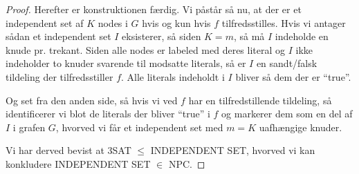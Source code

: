 \begin{proof}
Herefter er konstruktionen færdig. Vi påstår så nu, at der er et independent set af $K$ nodes i $G$ hvis og kun hvis $f$ tilfredsstilles. Hvis vi antager sådan et independent set $I$ eksisterer, så siden $K=m$, så må $I$ indeholde en knude pr. trekant. Siden alle nodes er labeled med deres literal og $I$ ikke indeholder to knuder svarende til modsatte literals, så er $I$ en sandt/falsk tildeling der tilfredsstiller $f$. Alle literals indeholdt i $I$ bliver så dem der er ``true''.

Og set fra den anden side, så hvis vi ved $f$ har en tilfredstillende tildeling, så identificerer vi blot de literals der bliver ``true'' i $f$ og markerer dem som en del af $I$ i grafen $G$, hvorved vi får et independent set med $m=K$ uafhængige knuder.

Vi har derved bevist at 3SAT $\leq$ INDEPENDENT SET, hvorved vi kan konkludere INDEPENDENT SET $\in$ NPC.
\end{proof}
